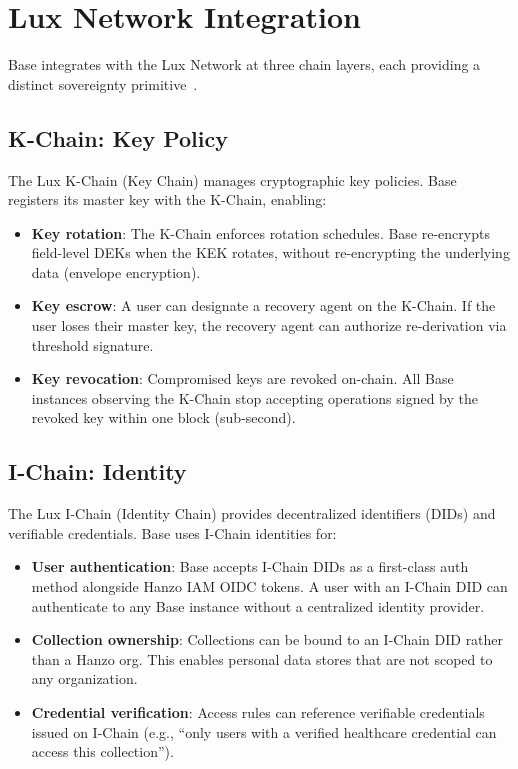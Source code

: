 \section{Lux Network Integration}

\label{sec:lux}

Base integrates with the Lux Network at three chain layers, each providing a
distinct sovereignty primitive~\cite{luxwhitepaper, luxtrust, luxapp}.

\subsection{K-Chain: Key Policy}

The Lux K-Chain (Key Chain) manages cryptographic key policies. Base registers
its master key with the K-Chain, enabling:

\begin{itemize}[leftmargin=1.1em]
    \item \textbf{Key rotation}: The K-Chain enforces rotation schedules. Base
    re-encrypts field-level DEKs when the KEK rotates, without re-encrypting
    the underlying data (envelope encryption).
    \item \textbf{Key escrow}: A user can designate a recovery agent on the
    K-Chain. If the user loses their master key, the recovery agent can
    authorize re-derivation via threshold signature.
    \item \textbf{Key revocation}: Compromised keys are revoked on-chain.
    All Base instances observing the K-Chain stop accepting operations signed
    by the revoked key within one block (sub-second).
\end{itemize}

\subsection{I-Chain: Identity}

The Lux I-Chain (Identity Chain) provides decentralized identifiers (DIDs)
and verifiable credentials. Base uses I-Chain identities for:

\begin{itemize}[leftmargin=1.1em]
    \item \textbf{User authentication}: Base accepts I-Chain DIDs as a first-class
    auth method alongside Hanzo IAM OIDC tokens. A user with an I-Chain DID
    can authenticate to any Base instance without a centralized identity
    provider.
    \item \textbf{Collection ownership}: Collections can be bound to an I-Chain
    DID rather than a Hanzo org. This enables personal data stores that are
    not scoped to any organization.
    \item \textbf{Credential verification}: Access rules can reference verifiable
    credentials issued on I-Chain (e.g., ``only users with a verified
    healthcare credential can access this collection'').
\end{itemize}

